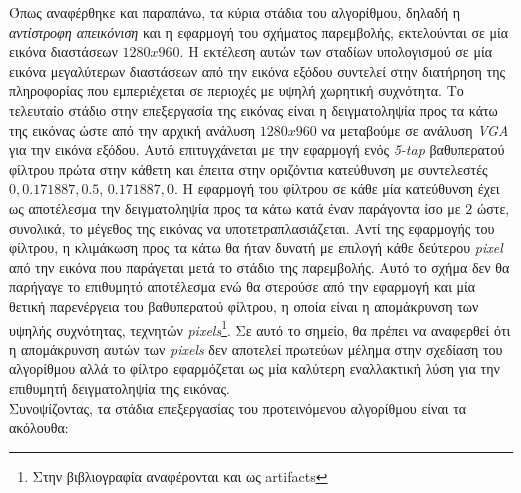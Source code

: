 Όπως αναφέρθηκε και παραπάνω, τα κύρια στάδια του αλγορίθμου, δηλαδή η \textsl{αντίστροφη απεικόνιση} και η εφαρμογή του σχήματος παρεμβολής, εκτελούνται σε μία εικόνα διαστάσεων \(1280x960\). Η εκτέλεση αυτών των σταδίων υπολογισμού σε μία εικόνα μεγαλύτερων διαστάσεων από την εικόνα εξόδου συντελεί στην διατήρηση της πληροφορίας που εμπεριέχεται σε περιοχές με υψηλή χωρητική συχνότητα. Το τελευταίο στάδιο στην επεξεργασία της εικόνας είναι η δειγματοληψία προς τα κάτω της εικόνας ώστε από την αρχική ανάλυση \(1280x960\) να μεταβούμε σε ανάλυση \textsl{VGA} για την εικόνα εξόδου. Αυτό επιτυγχάνεται με την εφαρμογή ενός \textsl{5-tap} βαθυπερατού φίλτρου πρώτα στην κάθετη και έπειτα στην οριζόντια κατεύθυνση με συντελεστές \(0, 0.171887, 0.5\), \(0.171887, 0\). Η εφαρμογή του φίλτρου σε κάθε μία κατεύθυνση έχει ως αποτέλεσμα την δειγματοληψία προς τα κάτω κατά έναν παράγοντα ίσο με \(2\) ώστε, συνολικά, το μέγεθος της εικόνας να υποτετραπλασιάζεται. Αντί της εφαρμογής του φίλτρου, η κλιμάκωση προς τα κάτω θα ήταν δυνατή με επιλογή κάθε δεύτερου \textsl{pixel} από την εικόνα που παράγεται μετά το στάδιο της παρεμβολής. Αυτό το σχήμα δεν θα παρήγαγε το επιθυμητό αποτέλεσμα ενώ θα στερούσε από την εφαρμογή και μία θετική παρενέργεια του βαθυπερατού φίλτρου, η οποία είναι η απομάκρυνση των υψηλής συχνότητας, τεχνητών \textsl{pixels}\footnote{\small Στην βιβλιογραφία αναφέρονται και ως artifacts}. Σε αυτό το σημείο, θα πρέπει να αναφερθεί ότι η απομάκρυνση αυτών των \textsl{pixels} δεν αποτελεί πρωτεύων μέλημα στην σχεδίαση του αλγορίθμου αλλά το φίλτρο εφαρμόζεται ως μία καλύτερη εναλλακτική λύση για την επιθυμητή δειγματοληψία της εικόνας.\\
\indent
Συνοψίζοντας, τα στάδια επεξεργασίας του προτεινόμενου αλγορίθμου είναι τα ακόλουθα:


